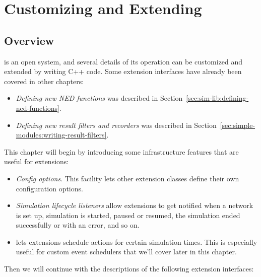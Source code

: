 \chapter{Customizing and Extending {\opp}}
\label{cha:plugin-exts}

\section{Overview}
\label{sec:plugin-exts:overview}

{\opp} is an open system, and several details of its operation can be
customized and extended by writing C++ code. Some extension interfaces
have already been covered in other chapters:

\begin{itemize}
   \item \textit{Defining new NED functions} was described in
     Section~\ref{sec:sim-lib:defining-ned-functions}.
   \item \textit{Defining new result filters and recorders} was described
     in Section~\ref{sec:simple-modules:writing-result-filters}.
\end{itemize}

This chapter will begin by introducing some infrastructure features that
are useful for extensions:

\begin{itemize}
   \item \textit{Config options}. This facility lets other extension classes
     define their own configuration options.
   \item \textit{Simulation lifecycle listeners} allow extensions to get
     notified when a network is set up, simulation is started, paused or resumed,
     the simulation ended successfully or with an error, and so on.
   \item {} lets extensions schedule actions for certain simulation
     times. This is especially useful for custom event schedulers that we'll
     cover later in this chapter.
\end{itemize}

Then we will continue with the descriptions of the following extension
interfaces:

